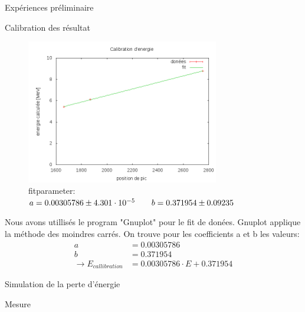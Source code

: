 \documentclass[a4paper,11pt]{scrartcl}
\begin{document}
\begin{section}{Expériences préliminaire}
\begin{subsection}{Calibration des résultat}
\begin{figure}
\begin{center}
   \includegraphics[width=0.75\textwidth]{Bilder/calibration.png}
\caption[calibration d'energie]{fitparameter: $ a = 0.00305786  \pm 4.301\cdot 10^{-5} \hspace{2 em} b = 0.371954  \pm 0.09235$ }
  \end{center}
\end{figure}
  \end{subsection}
  Nous avons utillisés le program "Gnuplot" pour le fit de donées. Gnuplot applique la méthode des moindres carrés. On trouve pour les coefficients a et b les valeurs:
\begin{align*}
a&= 0.00305786 \\
b&= 0.371954 \\
\rightarrow E_{callibration} &= 0.00305786  \cdot E +0.371954 
\end{align*}

  \begin{subsection}{Simulation de la perte d'énergie}
  \end{subsection}

 \begin{section}{Mesure}
  

\end{section}
\end{section}
\end{document}
